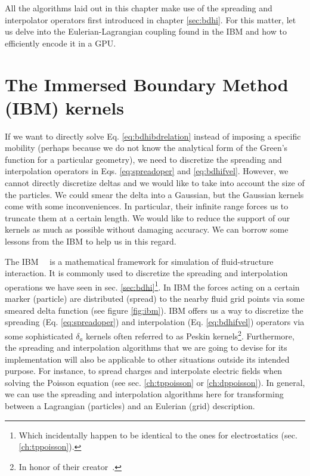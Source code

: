 \documentclass[ twoside,openright,titlepage,numbers=noenddot,%
headinclude,footinclude,cleardoublepage=empty,abstract=on,
BCOR=5mm,paper=b5,fontsize=11pt, dvipsnames
]{scrreprt}
\newcommand{\gpu}{\gls{GPU}\xspace}
\begin{document}
All the algorithms laid out in this chapter make use of the spreading and interpolator operators first introduced in chapter \ref{sec:bdhi}. For this matter, let us delve into the Eulerian-Lagrangian coupling found in the \gls{IBM} and how to efficiently encode it in a \gpu.

\chapter{The Immersed Boundary Method (IBM) kernels}\label{sec:ibm}
If we want to directly solve Eq. \eqref{eq:bdhibdrelation} instead of imposing a specific mobility (perhaps because we do not know the analytical form of the Green's function for a particular geometry), we need to discretize the spreading and interpolation operators in Eqs. \eqref{eq:spreadoper} and \eqref{eq:bdhifvel}. However, we cannot directly discretize deltas and we would like to take into account the size of the particles. We could smear the delta into a Gaussian, but the Gaussian kernels come with some inconveniences. In particular, their infinite range forces us to truncate them at a certain length. We would like to reduce the support of our kernels as much as possible without damaging accuracy. We can borrow some lessons from the \gls{IBM} to help us in this regard.

The \gls{IBM}~\cite{Peskin1977}~\cite{Peskin2002} is a mathematical framework for simulation of fluid-structure interaction. It is commonly used to discretize the spreading and interpolation operations we have seen in sec. \ref{sec:bdhi}\footnote{Which incidentally happen to be identical to the ones for electrostatics (sec. \ref{ch:tppoisson}).}. In \gls{IBM} the forces acting on a certain marker (particle) are distributed (spread) to the nearby fluid grid points via some smeared delta function (see figure \ref{fig:ibm}). \gls{IBM} offers us a way to discretize the spreading (Eq. \eqref{eq:spreadoper}) and interpolation (Eq. \eqref{eq:bdhifvel}) operators via some sophisticated $\delta_a$ kernels often referred to as Peskin kernels\footnote{In honor of their creator~\cite{Peskin1977}.}.
Furthermore, the spreading and interpolation algorithms that we are going to devise for its implementation will also be applicable to other situations outside its intended purpose. For instance, to spread charges and interpolate electric fields when solving the Poisson equation (see sec. \ref{ch:tppoisson} or \ref{ch:dppoisson}). In general, we can use the spreading and interpolation algorithms here for transforming between a Lagrangian (particles) and an Eulerian (grid) description.
\end{document}
